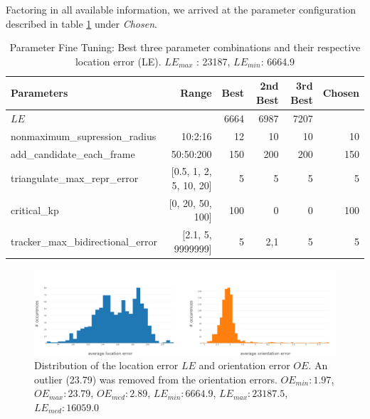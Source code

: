 \medskip

Factoring in all available information, we arrived at the parameter configuration described in table \ref{table:significant-param-tuning} under \emph{Chosen}.

\begin{table}[htp]
	\centering
	\caption{Parameter Fine Tuning: Best three parameter combinations and their respective location error (LE). $LE_{max}$ : 23187, $LE_{min}$: 6664.9}
	\label{table:significant-param-tuning}
	\begin{tabular}{lrrrrr}
		\hline
		\textbf{Parameters}                &         \textbf{Range} & \textbf{Best} & \textbf{2nd Best} & \textbf{3rd Best} & \textbf{Chosen} \\ \hline
		$LE$                &                        &          6664 &              6987 &              7207 &  \\ \hline\hline
		nonmaximum\_supression\_radius     &                10:2:16 &            12 &                10 &                10 & 10\\ \hline
		add\_candidate\_each\_frame        &              50:50:200 &           150 &               200 &               200 & 150\\ \hline
		triangulate\_max\_repr\_error      & [0.5, 1, 2, 5, 10, 20] &             5 &                 5 &                 5 & 5\\ \hline
		critical\_kp                       &       [0, 20, 50, 100] &           100 &                 0 &                 0 & 100\\ \hline
		tracker\_max\_bidirectional\_error &      [2.1, 5, 9999999] &             5 &               2,1 &                 5 & 5\\ \hline
	\end{tabular}
\end{table}

\begin{figure}[htp]
	\centering
	\includegraphics[width=1\textwidth]{figures/error_histogram}
	\caption{Distribution of the location error $LE$ and orientation error $OE$. 
	An outlier (23.79) was removed from the orientation errors. 
		$OE_{min}: 1.97$, 
		$OE_{max}: 23.79$,
		$OE_{med}: 2.89$,
		$LE_{min}: 6664.9$,
		$LE_{max}: 23187.5$,
		$LE_{med}: 16059.0$}
	\label{fig:error_histogram}
\end{figure}

